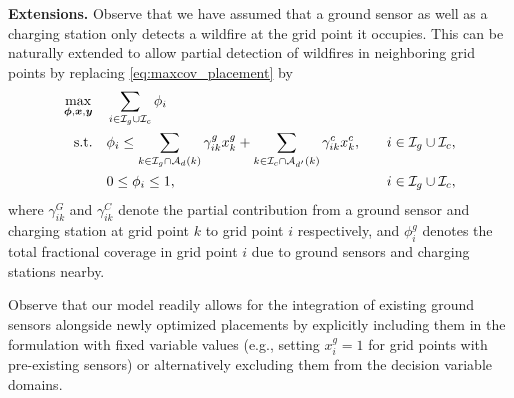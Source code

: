 \documentclass{article}
\newcommand{\set}[1]{\mathcal{#1}}
\newcommand{\danique}[1]{\textcolor{orange}{#1}}
\begin{document}
\textbf{Extensions.}
Observe that we have assumed that a ground sensor as well as a charging station only detects a wildfire at the grid point it occupies. This can be naturally extended to allow partial detection of wildfires in neighboring grid points by replacing \eqref{eq:maxcov_placement} by 
\begin{align*}
    \displaystyle \max_{\bm \phi, \bm x, \bm y} &\quad \displaystyle \sum_{i \in \set I_g \cup \set I_c} \phi_i \\
    {\rm s.t. } 
    &\quad \displaystyle \phi_i \leq \sum_{k \in \set I_g \cap \set A_d(k)} \gamma_{ik}^g x_k^g + \sum_{k \in \set I_c \cap \set A_{d'}(k)} \gamma_{ik}^c x_k^c, &\quad i \in \set I_g \cup \set I_c,\\
    &\quad \displaystyle 0 \leq \phi_i \leq 1, &\quad i \in \set I_g \cup \set I_c,
\end{align*}
where $\gamma_{ik}^G$ and $\gamma_{ik}^C$ denote the partial contribution from a ground sensor and charging station at grid point $k$ to grid point $i$ respectively, and $\phi_i^g$ denotes the total fractional coverage in grid point $i$ due to ground sensors and charging stations nearby.


Observe that our model readily allows for the integration of existing ground sensors alongside newly optimized placements by explicitly including them in the formulation with fixed variable values (e.g., setting $x_i^g = 1$ for grid points with pre-existing sensors) or alternatively excluding them from the decision variable domains.
\end{document}
